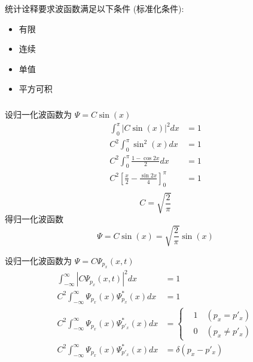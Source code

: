 \begin{frame}
    统计诠释要求波函数满足以下条件 (标准化条件):
    \begin{itemize}
         \item 有限
         \item 连续 
         \item 单值
         \item 平方可积
    \end{itemize}
\end{frame}

\begin{frame}[allowframebreaks=]
    \frametitle{}
    \解 设归一化波函数为 
    $\Psi=C\sin(x)$
    \begin{equation*}
        \begin{split}
            \int_0 ^\pi |C\sin(x)|^2 dx &=1 \\
            C^2 \int_0 ^\pi \sin^2(x) dx &=1 \\
            C^2 \int_0 ^\pi \frac{1-\cos 2x }{2} dx &=1 \\ 
            C^2 [\frac{x}{2}-\frac{\sin 2x}{4}]_0 ^\pi &=1 \\ 
        \end{split} 
     \end{equation*}
     \[C=\sqrt{\frac{2}{\pi}}\]
     得归一化波函数
     \begin{equation*}
        \Psi=C\sin(x)=\sqrt{\frac{2}{\pi}}\sin(x)
    \end{equation*}
\end{frame}

\begin{frame}  
    \解 设归一化波函数为
    $\Psi=C\Psi_{p_x} (x,t)$
    \begin{equation*}
        \begin{aligned}
            \int_{-\infty} ^\infty |C\Psi_{p_x} (x,t)|^2 dx &=1  \\
            C^2 \int_{-\infty} ^\infty \Psi_{p_x} (x) \Psi_{p_x}^* (x) dx &=1  \\
            C^2 \int_{-\infty} ^\infty \Psi_{p_x} (x) \Psi_{p'_x} ^* (x) dx &= \left\{\begin{aligned}
                &1 \quad (p_x= p'_x) \\ 
                &0 \quad (p_x \ne p'_x)
            \end{aligned}\right. \\
            C^2 \int_{-\infty} ^\infty \Psi_{p_x} (x) \Psi_{p'_x} ^* (x) dx &=\delta (p_x-p'_x)  
        \end{aligned} 
     \end{equation*}
    \end{frame}

